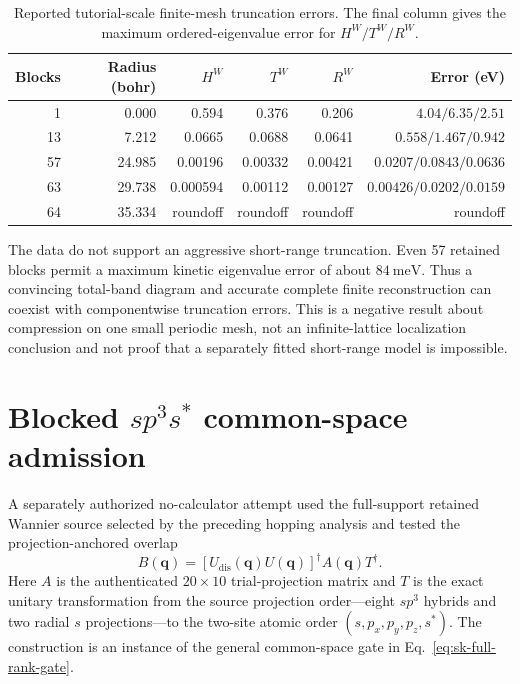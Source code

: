 \begin{table}[htbp]
  \centering
  \small
  \caption{Reported tutorial-scale finite-mesh truncation errors. The final column
  gives the maximum ordered-eigenvalue error for $H^W/T^W/R^W$.}
  \label{tab:preliminary-si-truncation}
  \begin{tabular}{rrrrrr}
    \toprule
    Blocks & Radius (bohr) & $H^W$ & $T^W$ & $R^W$ & Error (eV) \\
    \midrule
     1 &  0.000 & 0.594   & 0.376   & 0.206   & $4.04/6.35/2.51$ \\
    13 &  7.212 & 0.0665  & 0.0688  & 0.0641  & $0.558/1.467/0.942$ \\
    57 & 24.985 & 0.00196 & 0.00332 & 0.00421 & $0.0207/0.0843/0.0636$ \\
    63 & 29.738 & 0.000594& 0.00112 & 0.00127 & $0.00426/0.0202/0.0159$ \\
    64 & 35.334 & roundoff& roundoff& roundoff& roundoff \\
    \bottomrule
  \end{tabular}
\end{table}

The data do not support an aggressive short-range truncation. Even 57 retained
blocks permit a maximum kinetic eigenvalue error of about $84\ \mathrm{meV}$.
Thus a convincing total-band diagram and accurate complete finite
reconstruction can coexist with componentwise truncation errors. This is a
negative result about compression on one small periodic mesh, not an
infinite-lattice localization conclusion and not proof that a separately
fitted short-range model is impossible.

\section{Blocked \texorpdfstring{$sp^3s^{\ast}$}{sp3s*} common-space admission}

A separately authorized no-calculator attempt used the full-support retained
Wannier source selected by the preceding hopping analysis and tested the
projection-anchored overlap
\begin{equation}
  B(\mathbf q)
  =
  [U_{\mathrm{dis}}(\mathbf q)U(\mathbf q)]^{\dagger}
  A(\mathbf q)T^{\dagger}.
  \label{eq:appendix-m-sk-overlap}
\end{equation}
Here $A$ is the authenticated $20\times10$ trial-projection matrix and $T$ is
the exact unitary transformation from the source projection order---eight
$sp^3$ hybrids and two radial $s$ projections---to the two-site atomic order
$(s,p_x,p_y,p_z,s^{\ast})$. The construction is an instance of the general
common-space gate in Eq.~\eqref{eq:sk-full-rank-gate}.

